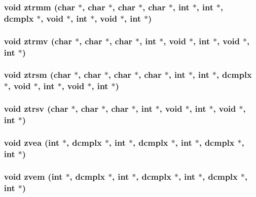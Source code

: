 \subsubsection{\setlength{\rightskip}{0pt plus 5cm}void ztrmm (char $\ast$, char $\ast$, char $\ast$, char $\ast$, int $\ast$, int $\ast$, {\bf dcmplx} $\ast$, void $\ast$, int $\ast$, void $\ast$, int $\ast$)}\label{essl_8h_86191a4e6a2f6d189e55c22cebc02955}


\subsubsection{\setlength{\rightskip}{0pt plus 5cm}void ztrmv (char $\ast$, char $\ast$, char $\ast$, int $\ast$, void $\ast$, int $\ast$, void $\ast$, int $\ast$)}\label{essl_8h_f0e089b25164d6efea1f632b6b4992a1}


\subsubsection{\setlength{\rightskip}{0pt plus 5cm}void ztrsm (char $\ast$, char $\ast$, char $\ast$, char $\ast$, int $\ast$, int $\ast$, {\bf dcmplx} $\ast$, void $\ast$, int $\ast$, void $\ast$, int $\ast$)}\label{essl_8h_ba1449fef71f993d41eb95b1142d4ce8}


\subsubsection{\setlength{\rightskip}{0pt plus 5cm}void ztrsv (char $\ast$, char $\ast$, char $\ast$, int $\ast$, void $\ast$, int $\ast$, void $\ast$, int $\ast$)}\label{essl_8h_7ae1a925c4581517530a65470779fd13}


\subsubsection{\setlength{\rightskip}{0pt plus 5cm}void zvea (int $\ast$, {\bf dcmplx} $\ast$, int $\ast$, {\bf dcmplx} $\ast$, int $\ast$, {\bf dcmplx} $\ast$, int $\ast$)}\label{essl_8h_707de5b4f47bb6dd30206880569b74af}


\subsubsection{\setlength{\rightskip}{0pt plus 5cm}void zvem (int $\ast$, {\bf dcmplx} $\ast$, int $\ast$, {\bf dcmplx} $\ast$, int $\ast$, {\bf dcmplx} $\ast$, int $\ast$)}\label{essl_8h_45e5b3c796a58e6b76d791c7e8584dbf}



